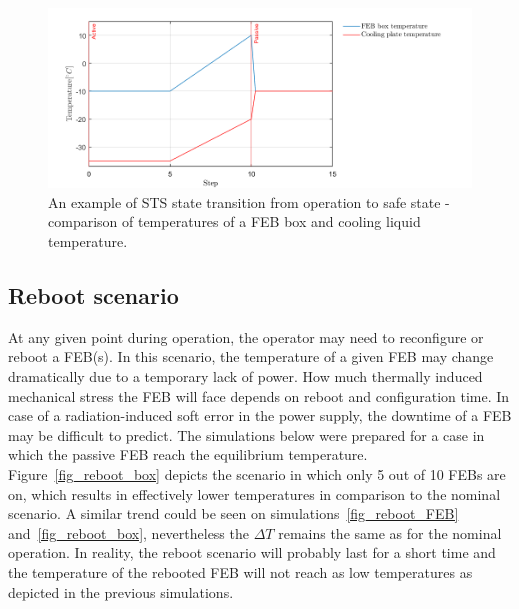 \begin{figure}[!h]
\centering
\includegraphics[width=0.95\columnwidth]{Chapter3/Cycling/Images/nominal_all.png}
\caption{An example of \gls{STS} state transition from operation to safe state - comparison of temperatures of a \gls{FEB} box and cooling liquid temperature.}
\label{fig_nominal_scenario}
\end{figure}

\subsection{Reboot scenario}
\label{reboot}
At any given point during operation, the operator may need to reconfigure or reboot a \gls{FEB}(s). In this scenario, the temperature of a given \gls{FEB} may change dramatically due to a temporary lack of power. How much thermally induced mechanical stress the \gls{FEB} will face depends on reboot and configuration time. In case of a radiation-induced soft error in the power supply, the downtime of a \gls{FEB} may be difficult to predict. The simulations below were prepared for a case in which the passive \gls{FEB} reach the equilibrium temperature. Figure~\ref{fig_reboot_box} depicts the scenario in which only 5 out of 10 \glspl{FEB} are on, which results in effectively lower temperatures in comparison to the nominal scenario. A similar trend could be seen on simulations~\ref{fig_reboot_FEB} and~\ref{fig_reboot_box}, nevertheless the $\Delta T$ remains the same as for the nominal operation. In reality, the reboot scenario will probably last for a short time and the temperature of the rebooted \gls{FEB} will not reach as low temperatures as depicted in the previous simulations.



